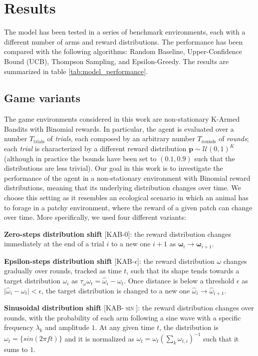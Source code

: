 \section{Results}

The model has been tested in a series of benchmark environments, each with a different number of arms and reward distributions. The performance has been compared with the following algorithms: Random Baseline, Upper-Confidence Bound (UCB), Thompson Sampling, and Epsilon-Greedy. The results are summarized in table \ref{tab:model_performance}.

\subsection{Game variants}
\noindent The game environments considered in this work are non-stationary K-Armed Bandits with Binomial rewards. In particular, the agent is evaluated over a number $T_{\text{trials}}$ of \textit{trials}, each composed by an arbitrary number $T_{\text{rounds}}$ of \textit{rounds}; each \textit{trial} is characterized by a different reward distribution $\mathbf{p}\sim\mathcal{U}(0,1)^{K}$ (although in practice the bounds have been set to $(0.1, 0.9)$ such that the distributions are less trivial). Our goal in this work is to investigate the performance of the agent in a non-stationary environment with Binomial reward distributions, meaning that its underlying distribution changes over time.
We choose this setting as it resembles an ecological scenario in which an animal has to forage in a patchy environment, where the reward of a given patch can change over time.
More specifically, we used four different variants:

\noindent \textbf{Zero-steps distribution shift} [\textsc{KAB-0}]: the reward distribution changes immediately at the end of a trial $i$ to a new one $i+1$ as $\mathbf{\omega}_{i} \to \mathbf{\omega}_{i+1}$. 

\noindent \textbf{Epsilon-steps distribution shift} [\textsc{KAB-$\epsilon$}]: the reward distribution $\omega$ changes gradually over rounds, tracked as time $t$, such that its shape tends towards a target distribution $\hat{\omega}_{i}$ as $\tau_{\omega}\dot{\omega}_{t}=\hat{\omega}_{i}-\omega_{t}$. Once distance is below a threshold $\epsilon$ as $\vert \hat{\omega}_{i} - \omega_{t}\vert < \epsilon$, the target distribution is changed to a new one $\hat{\omega}_{i}\to\hat{\omega}_{i+1}$.

\noindent \textbf{Sinusoidal distribution shift} [\textsc{KAB-$\sin$}]: the reward distribution changes over rounds, with the probability of each arm following a sine wave with a specific frequency $\lambda_{k}$ and amplitude $1$. At any given time $t$, the distribution is $\omega_{t}=\{sin(2\pi f t)\}$ and it is
normalized as $\omega_{t} = \omega_{t}(\sum_{k} \omega_{t,i})^{-1}$ such that it sums to $1$.

